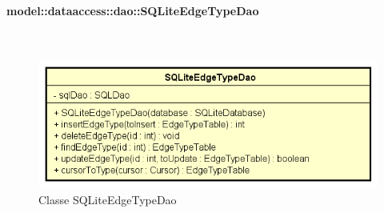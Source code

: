\documentclass[../DefinizioneDiProdotto.tex]{subfiles}
\begin{document}
\paragraph{model::dataaccess::dao::SQLiteEdgeTypeDao}
\
\begin{figure}[H]
	\centering
	\includegraphics[width=\maxwidth]{img/SQLiteEdgeTypeDao.png}
	\caption{Classe SQLiteEdgeTypeDao}\label{fig:model::dataaccess::dao::SQLiteEdgeTypeDao} 
\end{figure}
\end{document}

